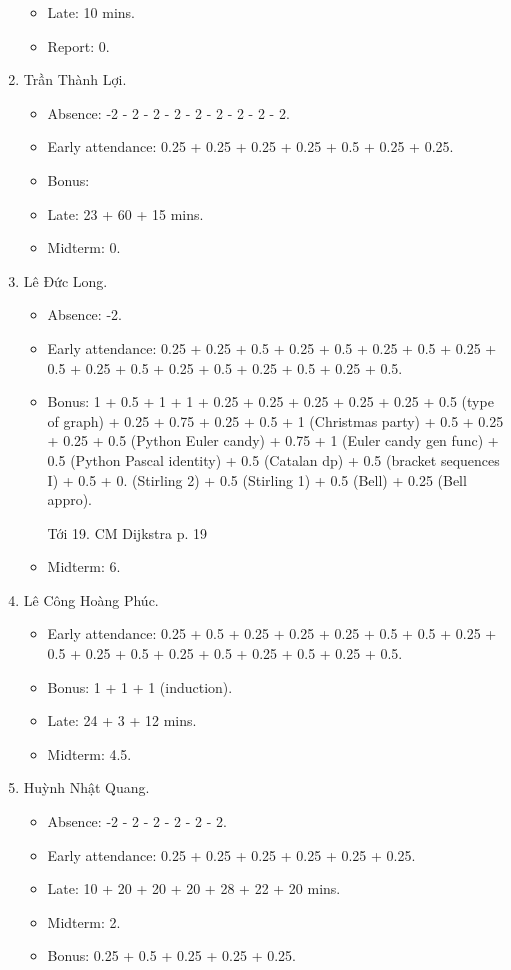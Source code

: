 \documentclass{article}
\begin{document}
\begin{enumerate}
\begin{itemize}
		\item Late: 10 mins.
        \item Report: 0.
	\end{itemize}
	\item {\sc Trần Thành Lợi.}
	\begin{itemize}
		\item Absence: -2 - 2 - 2 - 2 - 2 - 2 - 2 - 2 - 2.
		\item Early attendance: 0.25 + 0.25 + 0.25 + 0.25 + 0.5 + 0.25 + 0.25.
		\item Bonus:
		\item Late: 23 + 60 + 15 mins.
        \item Midterm: 0.
	\end{itemize}
	\item {\sc Lê Đức Long.}
	\begin{itemize}
		\item Absence: -2.
		\item Early attendance: 0.25 + 0.25 + 0.5 + 0.25 + 0.5 + 0.25 + 0.5 + 0.25 + 0.5 + 0.25 + 0.5 + 0.25 + 0.5 + 0.25 + 0.5 + 0.25 + 0.5.
		\item Bonus: 1 + 0.5 + 1 + 1 + 0.25 + 0.25 + 0.25 + 0.25 + 0.25 + 0.5 (type of graph) + 0.25 + 0.75 + 0.25 + 0.5 + 1 (Christmas party) + 0.5 + 0.25 + 0.25 + 0.5 (Python Euler candy) + 0.75 + 1 (Euler candy gen func) + 0.5 (Python Pascal identity) + 0.5 (Catalan dp) + 0.5 (bracket sequences I) + 0.5 + 0. (Stirling 2) + 0.5 (Stirling 1) + 0.5 (Bell) + 0.25 (Bell appro).

        Tới 19. CM Dijkstra p. 19
        \item Midterm: 6.
	\end{itemize}
	\item {\sc Lê Công Hoàng Phúc.}
	\begin{itemize}
		\item Early attendance: 0.25 + 0.5 + 0.25 + 0.25 + 0.25 + 0.5 + 0.5 + 0.25 + 0.5 + 0.25 + 0.5 + 0.25 + 0.5 + 0.25 + 0.5 + 0.25 + 0.5.
		\item Bonus: 1 + 1 + 1 (induction).
		\item Late: 24 + 3 + 12 mins.
        \item Midterm: 4.5.
	\end{itemize}
	\item {\sc Huỳnh Nhật Quang.}
	\begin{itemize}
		\item Absence: -2 - 2 - 2 - 2 - 2 - 2.
		\item Early attendance: 0.25 + 0.25 + 0.25 + 0.25 + 0.25 + 0.25.
		\item Late: 10 + 20 + 20 + 20 + 28 + 22 + 20 mins.
        \item Midterm: 2.
		\item Bonus: 0.25 + 0.5 + 0.25 + 0.25 + 0.25.


\end{itemize}
\end{enumerate}
\end{document}
